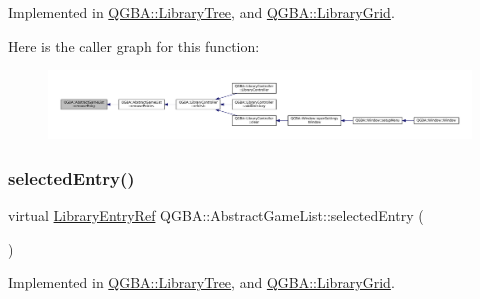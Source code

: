 Implemented in \mbox{\hyperlink{class_q_g_b_a_1_1_library_tree_a0464c26602fd0ad56c418d888a9b12b9}{Q\+G\+B\+A\+::\+Library\+Tree}}, and \mbox{\hyperlink{class_q_g_b_a_1_1_library_grid_a277472016829a03006aea069ffd360fa}{Q\+G\+B\+A\+::\+Library\+Grid}}.

Here is the caller graph for this function\+:
\nopagebreak
\begin{figure}[H]
\begin{center}
\leavevmode
\includegraphics[width=350pt]{class_q_g_b_a_1_1_abstract_game_list_ab0745ae397ca851cf29377511b10ee6f_icgraph}
\end{center}
\end{figure}
\mbox{\label{class_q_g_b_a_1_1_abstract_game_list_ac456bb5443e0b60ff7fb6e3d64fbb338}} 
\subsubsection{\texorpdfstring{selected\+Entry()}{selectedEntry()}}
{\footnotesize\ttfamily virtual \mbox{\hyperlink{namespace_q_g_b_a_a201fa9f2cb8f778666a134ba81909358}{Library\+Entry\+Ref}} Q\+G\+B\+A\+::\+Abstract\+Game\+List\+::selected\+Entry (\begin{DoxyParamCaption}{ }\end{DoxyParamCaption})\hspace{0.3cm}{\ttfamily [pure virtual]}}



Implemented in \mbox{\hyperlink{class_q_g_b_a_1_1_library_tree_a4066e38c1708df9e31f451c78c3905bc}{Q\+G\+B\+A\+::\+Library\+Tree}}, and \mbox{\hyperlink{class_q_g_b_a_1_1_library_grid_a94005ca0086b9d47e274bcf7b8bf633c}{Q\+G\+B\+A\+::\+Library\+Grid}}.

